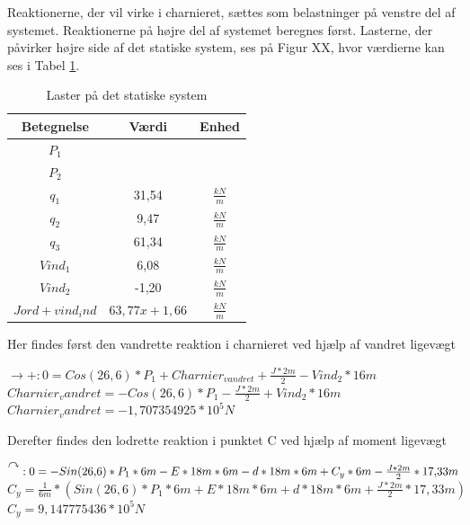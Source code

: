 Reaktionerne, der vil virke i charnieret, sættes som belastninger på venstre del af systemet. 
\newline
\newline
Reaktionerne på højre del af systemet beregnes først.
\newline
\newline
Lasterne, der påvirker højre side af det statiske system, ses på Figur XX, hvor værdierne kan ses i Tabel \ref{tab:laster}.

\begin{table}
	\begin{center}
		\begin{tabular}{|c|c|c|}
			\hline
Betegnelse     & Værdi & Enhed \\ \hline
$P_1$           &       &       \\ \hline
$P_2$           &       &       \\ \hline
$q_1$           & 31,54 & $\frac{kN}{m}$ \\ \hline
$q_2$           & 9,47  & $\frac{kN}{m}$ \\ \hline
$q_3$           & 61,34 & $\frac{kN}{m}$ \\ \hline
$Vind_1$        & 6,08  & $\frac{kN}{m}$ \\ \hline
$Vind_2$       	& -1,20 & $\frac{kN}{m}$ \\ \hline
$Jord+vind_ind$ & $63,\!77x + 1,\!66$ & $\frac{kN}{m}$ \\ \hline
		\end{tabular}
		\caption{Laster på det statiske system}
		\label{tab:laster}
	\end{center}
\end{table}

Her findes først den vandrette reaktion i charnieret ved hjælp af vandret ligevægt
\begin{center}
	$\rightarrow+:0=Cos(26,\!6)*P_1+Charnier_{vandret}+\frac{J*2m}{2}-Vind_2*16m$
	$Charnier_vandret=-Cos(26,\!6)*P_1-\frac{J*2m}{2}+Vind_2*16m$
	$Charnier_vandret=-1,\!707354925*10^5N$
\end{center}

Derefter findes den lodrette reaktion i punktet C ved hjælp af moment ligevægt
\begin{center}
	$\AR{}:0=-Sin(26,\!6)*P_1*6m-E*18m*6m-d*18m*6m+C_y*6m-\frac{J*2m}{2}*17,\!33m$
	$C_y=\frac{1}{6m}*(Sin(26,\!6)*P_1*6m+E*18m*6m+d*18m*6m+\frac{J*2m}{2}*17,\!33m)$
	$C_y=9,\!147775436*10^5N$ 
\end{center}

